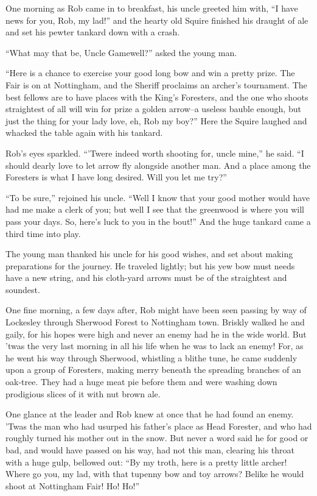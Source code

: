 One morning as Rob came in to breakfast, his uncle greeted him with, ``I
have news for you, Rob, my lad!'' and the hearty old Squire finished his
draught of ale and set his pewter tankard down with a crash.

``What may that be, Uncle Gamewell?'' asked the young man.

``Here is a chance to exercise your good long bow and win a pretty
prize. The Fair is on at Nottingham, and the Sheriff proclaims an
archer's tournament. The best fellows are to have places with the King's
Foresters, and the one who shoots straightest of all will win for prize
a golden arrow--a useless bauble enough, but just the thing for your
lady love, eh, Rob my boy?'' Here the Squire laughed and whacked the
table again with his tankard.

Rob's eyes sparkled. ``'Twere indeed worth shooting for, uncle mine,''
he said. ``I should dearly love to let arrow fly alongside another man.
And a place among the Foresters is what I have long desired. Will you
let me try?''

``To be sure,'' rejoined his uncle. ``Well I know that your good mother
would have had me make a clerk of you; but well I see that the greenwood
is where you will pass your days. So, here's luck to you in the bout!''
And the huge tankard came a third time into play.

The young man thanked his uncle for his good wishes, and set about
making preparations for the journey. He traveled lightly; but his yew
bow must needs have a new string, and his cloth-yard arrows must be of
the straightest and soundest.

One fine morning, a few days after, Rob might have been seen passing by
way of Lockesley through Sherwood Forest to Nottingham town. Briskly
walked he and gaily, for his hopes were high and never an enemy had he
in the wide world. But 'twas the very last morning in all his life when
he was to lack an enemy! For, as he went his way through Sherwood,
whistling a blithe tune, he came suddenly upon a group of Foresters,
making merry beneath the spreading branches of an oak-tree. They had a
huge meat pie before them and were washing down prodigious slices of it
with nut brown ale.

One glance at the leader and Rob knew at once that he had found an
enemy. 'Twas the man who had usurped his father's place as Head
Forester, and who had roughly turned his mother out in the snow. But
never a word said he for good or bad, and would have passed on his way,
had not this man, clearing his throat with a huge gulp, bellowed out:
``By my troth, here is a pretty little archer! Where go you, my lad,
with that tupenny bow and toy arrows? Belike he would shoot at
Nottingham Fair! Ho! Ho!''

